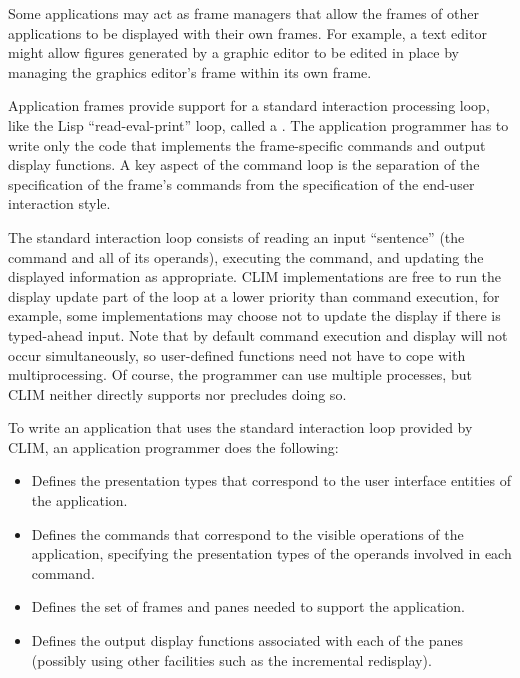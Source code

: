 Some applications may act as frame managers that allow the frames of other
applications to be displayed with their own frames.  For example, a text editor
might allow figures generated by a graphic editor to be edited in place by
managing the graphics editor's frame within its own frame.

Application frames provide support for a standard interaction processing loop,
like the Lisp ``read-eval-print'' loop, called a .  The
application programmer has to write only the code that implements the
frame-specific commands and output display functions.  A key aspect of the
command loop is the separation of the specification of the frame's commands from
the specification of the end-user interaction style.

The standard interaction loop consists of reading an input ``sentence'' (the
command and all of its operands), executing the command, and updating the
displayed information as appropriate.  CLIM implementations are free to run the
display update part of the loop at a lower priority than command execution, for
example, some implementations may choose not to update the display if there is
typed-ahead input.  Note that by default command execution and display will not
occur simultaneously, so user-defined functions need not have to cope with
multiprocessing.  Of course, the programmer can use multiple processes, but CLIM
neither directly supports nor precludes doing so.

To write an application that uses the standard interaction loop provided by
CLIM, an application programmer does the following:

\begin{itemize}
\item Defines the presentation types that correspond to the user interface
entities of the application.

\item Defines the commands that correspond to the visible operations of the
application, specifying the presentation types of the operands involved in each
command.

\item Defines the set of frames and panes needed to support the application.

\item Defines the output display functions associated with each of the panes
(possibly using other facilities such as the incremental redisplay).
\end{itemize}

